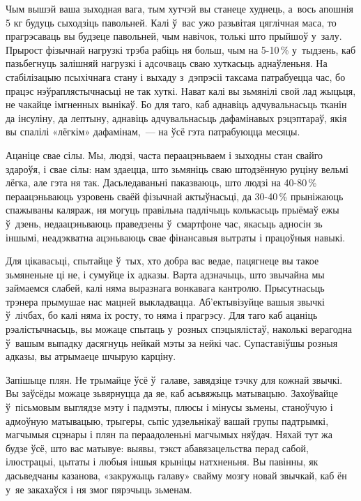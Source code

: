 Чым вышэй ваша зыходная вага, тым хутчэй вы станеце худнець, а~вось апошнія 5 кг будуць сыходзіць павольней. Калі ў~вас ужо разьвітая цяглічная маса, то прагрэсаваць вы будзеце павольней, чым навічок, толькі што прыйшоў у~залу. Прырост фізычнай нагрузкі трэба рабіць ня больш, чым на 5-10\,\% у~тыдзень, каб пазьбегнуць залішняй нагрузкі і адсочваць сваю хуткасьць аднаўленьня. На стабілізацыю псыхічнага стану і выхаду з~дэпрэсіі таксама патрабуецца час, бо працэс нэўраплястычнасьці не так хуткі. Нават калі вы зьмянілі свой лад жыцьця, не чакайце імгненных вынікаў. Бо для таго, каб аднавіць адчувальнасьць тканін да інсуліну, да лептыну, аднавіць адчувальнасьць дафамінавых рэцэптараў, якія вы спалілі «лёгкім» дафамінам,~--- на ўсё гэта патрабуюцца месяцы.

Ацаніце свае сілы. Мы, людзі, часта пераацэньваем і зыходны стан свайго здароўя, і свае сілы: нам здаецца, што зьмяніць сваю штодзённую руціну вельмі лёгка, але гэта ня так. Дасьледаваньні паказваюць, што людзі на 40-80\,\% пераацэньваюць узровень сваёй фізычнай актыўнасьці, да 30-40\,\% прыніжаюць спажываны каляраж, ня могуць правільна падлічыць колькасьць прыёмаў ежы ў~дзень, недаацэньваюць праведзены ў~смартфоне час, якасьць адносін зь іншымі, неадэкватна ацэньваюць свае фінансавыя вытраты і працоўныя навыкі.

Для цікавасьці, спытайце ў~тых, хто добра вас ведае, пацягнеце вы такое зьмяненьне ці не, і сумуйце іх адказы. Варта адзначыць, што звычайна мы займаемся слабей, калі няма выразнага вонкавага кантролю. Прысутнасьць трэнера прымушае нас мацней выкладвацца. Аб'ектывізуйце вашыя звычкі ў~лічбах, бо калі няма іх росту, то няма і прагрэсу. Для таго каб ацаніць рэалістычнасьць, вы можаце спытаць у~розных спэцыялістаў, наколькі верагодна ў~вашым выпадку дасягнуць нейкай мэты за нейкі час. Супаставіўшы розныя адказы, вы атрымаеце шчырую карціну.

Запішыце плян. Не трымайце ўсё ў~галаве, завядзіце тэчку для кожнай звычкі. Вы заўсёды можаце зьвярнуцца да яе, каб асьвяжыць матывацыю. Захоўвайце ў~пісьмовым выглядзе мэту і падмэты, плюсы і мінусы зьмены, станоўчую і адмоўную матывацыю, трыгеры, сьпіс удзельнікаў вашай групы падтрымкі, магчымыя сцэнары і плян па пераадоленьні магчымых няўдач. Няхай тут жа будзе ўсё, што вас матывуе: выявы, тэкст абавязацельства перад сабой, ілюстрацыі, цытаты і любыя іншыя крыніцы натхненьня. Вы павінны, як дасьведчаны казанова, «закружыць галаву» свайму мозгу новай звычкай, каб ён у~яе закахаўся і ня змог пярэчыць зьменам.

